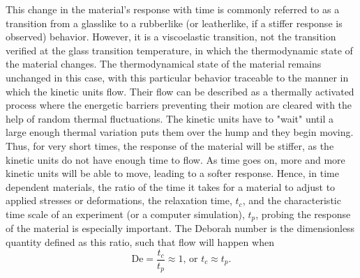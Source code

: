 This change in the material's response with time is commonly referred to as a transition from a glasslike to a rubberlike (or leatherlike, if a stiffer response is observed) behavior.
However, it is a viscoelastic transition, not the transition verified at the glass transition temperature, in which the thermodynamic state of the material changes.
The thermodynamical state of the material remains unchanged in this case, with this particular behavior traceable to the manner in which the kinetic units flow.
Their flow can be described as a thermally activated process where the energetic barriers preventing their motion are cleared with the help of random thermal fluctuations.
The kinetic units have to "wait" until a large enough thermal variation puts them over the hump and they begin moving.
Thus, for very short times, the response of the material will be stiffer, as the kinetic units do not have enough time to flow.
As time goes on, more and more kinetic units will be able to move, leading to a softer response.
Hence, in time dependent materials, the ratio of the time it takes for a material to adjust to applied stresses or deformations, the relaxation time, $t_c$, and the characteristic time scale of an experiment (or a computer simulation), $t_p$, probing the response of the material is especially important.
The Deborah number is the dimensionless quantity defined as this ratio, such that flow will happen when \citep{wardIntroductionMechanicalProperties2004, arzhakovRelaxationPhysicalMechanical2019}
\begin{equation}
    \mathrm{De}=\frac{t_c}{t_p}\approx 1\text{, or  }t_c\approx t_p.
\end{equation}

